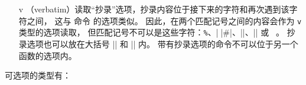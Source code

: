 \documentclass{l3doc}
\begin{document}
\begin{itemize}[font=\ttfamily]
    \item[v] （verbatim）读取“抄录”选项，抄录内容位于接下来的字符和再次遇到该字符之间，
    这与 \LaTeXe{} 命令  的选项类似。
    因此，在两个匹配记号之间的内容会作为 \texttt{v} 类型的选项读取，
    但匹配记号不可以是这些字符：\verb|%|、|\|、|#|、|{|、|}| 或 \verb*| |。
    抄录选项也可以放在大括号 |{| 和 |}| 内。
    带有抄录选项的命令不可以位于另一个函数的选项内。
\end{itemize}
可选项的类型有：
\end{document}
